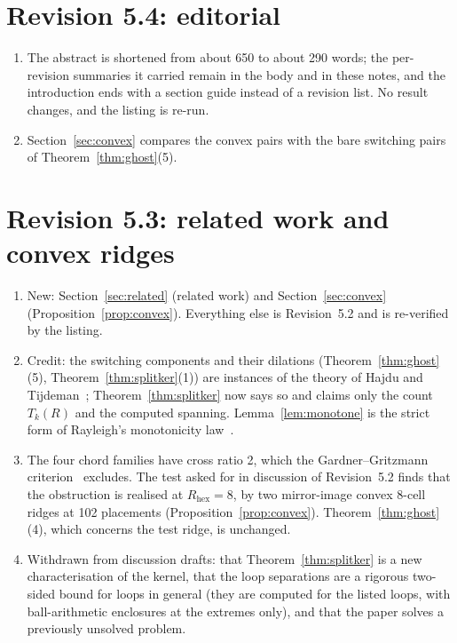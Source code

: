 \documentclass[11pt,a4paper]{article}
\theoremstyle{definition}
\theoremstyle{remark}
\begin{document}
\section*{Revision 5.4: editorial}
\begin{enumerate}[noitemsep,leftmargin=*]
\item The abstract is shortened from about 650 to about 290 words; the per-revision summaries it carried remain in the body and in these notes, and the introduction ends with a section guide instead of a revision list. No result changes, and the listing is re-run.
\item Section~\ref{sec:convex} compares the convex pairs with the bare switching pairs of Theorem~\ref{thm:ghost}(5).
\end{enumerate}

\section*{Revision 5.3: related work and convex ridges}
\begin{enumerate}[noitemsep,leftmargin=*]
\item New: Section~\ref{sec:related} (related work) and Section~\ref{sec:convex} (Proposition~\ref{prop:convex}). Everything else is Revision~5.2 and is re-verified by the listing.
\item Credit: the switching components and their dilations (Theorem~\ref{thm:ghost}(5), Theorem~\ref{thm:splitker}(1)) are instances of the theory of Hajdu and Tijdeman~\cite{hajdu2001,hajdu2001laa}; Theorem~\ref{thm:splitker} now says so and claims only the count $T_k(R)$ and the computed spanning. Lemma~\ref{lem:monotone} is the strict form of Rayleigh's monotonicity law~\cite{doyle1984}.
\item The four chord families have cross ratio 2, which the Gardner--Gritzmann criterion~\cite{gardner1997} excludes. The test asked for in discussion of Revision~5.2 finds that the obstruction is realised at $R_{\text{hex}} = 8$, by two mirror-image convex 8-cell ridges at 102 placements (Proposition~\ref{prop:convex}). Theorem~\ref{thm:ghost}(4), which concerns the test ridge, is unchanged.
\item Withdrawn from discussion drafts: that Theorem~\ref{thm:splitker} is a new characterisation of the kernel, that the loop separations are a rigorous two-sided bound for loops in general (they are computed for the listed loops, with ball-arithmetic enclosures at the extremes only), and that the paper solves a previously unsolved problem.
\end{enumerate}
\end{document}

